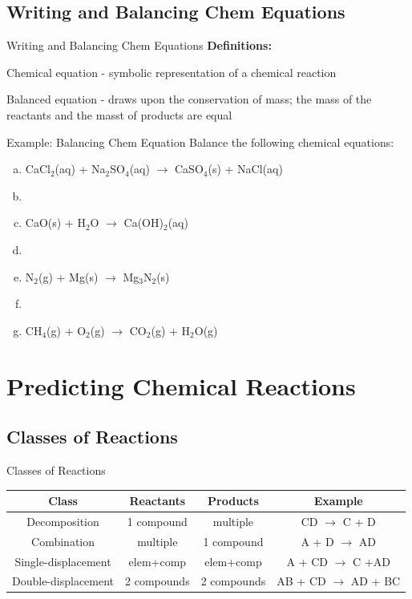\documentclass[11pt]{beamer}
\begin{document}
\subsection{Writing and Balancing Chem Equations}

\begin{frame}{Writing and Balancing Chem Equations}
  \textbf{Definitions:}

  Chemical equation - symbolic representation of a chemical
  reaction

  Balanced equation - draws upon the conservation of mass; the
  mass of the reactants and the masst of products are equal

\end{frame}

\begin{frame}{Example: Balancing Chem Equation}
  Balance the following chemical equations:

  \begin{enumerate}[(a)]
  \item CaCl$_2$(aq) + Na$_2$SO$_4$(aq) $\rightarrow$
    CaSO$_4$(s) + NaCl(aq)
  \item[]
  \item CaO(s) + H$_2$O $\rightarrow$ Ca(OH)$_2$(aq)
  \item[]
  \item N$_2$(g) + Mg(s) $\rightarrow$ Mg$_3$N$_2$(s)
  \item[]
  \item CH$_4$(g) + O$_2$(g) $\rightarrow$ CO$_2$(g) + H$_2$O(g)
  \end{enumerate}
  
\end{frame}

\section{Predicting Chemical Reactions}

\subsection{Classes of Reactions}

\begin{frame}{Classes of Reactions}
  \footnotesize
  \begin{table}[hbpt]
    \centering
    \begin{tabular}{c|ccc}
      Class & Reactants & Products & Example \\
      \hline\hline
      Decomposition & 1 compound & multiple   & CD $\rightarrow$ C + D \\
      Combination   & multiple   & 1 compound & A + D $\rightarrow$ AD \\
      Single-displacement & elem+comp & elem+comp & A + CD $\rightarrow$ C +AD\\
      Double-displacement & 2 compounds & 2 compounds & AB + CD $\rightarrow$ AD + BC
    \end{tabular}
  \end{table}
\end{frame}
\end{document}
